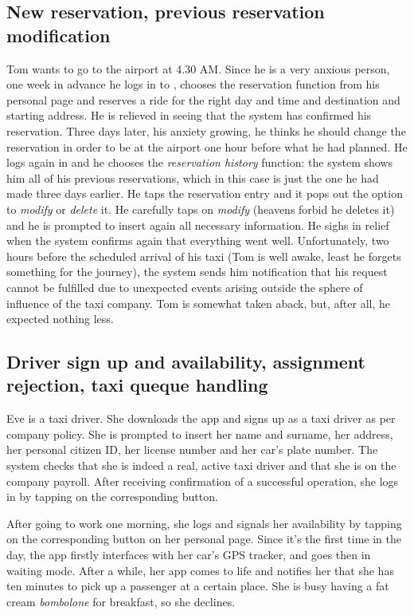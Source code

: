 \subsection{New reservation,  previous reservation modification}
Tom wants to go to the airport at 4.30 AM. Since he is a very anxious person, one week in advance he logs in to \mts{}, chooses the reservation function from his personal page and reserves a ride for the right day and time and destination and starting address. He is relieved in seeing that the system has confirmed his reservation.
Three days later, his anxiety growing, he thinks he should change the reservation in order to be at the airport one hour before what he had planned. He logs again in \mts{} and he chooses the \emph{reservation history} function: the system shows him all of his previous reservations, which in this case is just the one he had made three days earlier. He taps the reservation entry and it pops out the option to \emph{modify} or \emph{delete} it. He carefully taps on \emph{modify} (heavens forbid he deletes it) and he is prompted to insert again all necessary information. He sighs in relief when the system confirms again that everything went well.
Unfortunately, two hours before the scheduled arrival of his taxi (Tom is well awake, least he forgets something for the journey), the system sends him notification that his request cannot be fulfilled due to unexpected events arising outside the sphere of influence of the taxi company. Tom is somewhat taken aback, but, after all, he expected nothing less.

\subsection{Driver sign up and availability, assignment rejection, taxi queque handling}
Eve is a taxi driver. She downloads the \mts{} app and signs up as a taxi driver as per company policy. She is prompted to insert her name and surname, her address, her personal citizen ID, her license number and her car's plate number. The system checks that she is indeed a real, active taxi driver and that she is on the company payroll. After receiving confirmation of a successful operation, she logs in by tapping on the corresponding button.

After going to work one morning, she logs and signals her availability by tapping on the corresponding button on her personal page. Since it's the first time in the day, the app firstly interfaces with her car's GPS tracker, and goes then in waiting mode. After a while, her app comes to life and notifies her that she has ten minutes to pick up a passenger at a certain place. She is busy having a fat cream \emph{bombolone} for breakfast, so she declines.


